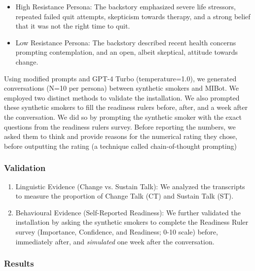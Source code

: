 \begin{itemize}
    \item High Resistance Persona: The backstory emphasized severe life stressors, repeated failed quit attempts, skepticism towards therapy, and a strong belief that it was not the right time to quit.
    \item Low Resistance Persona: The backstory described recent health concerns prompting contemplation, and an open, albeit skeptical, attitude towards change.
\end{itemize}

Using modified prompts and GPT-4 Turbo (temperature=1.0), we generated conversations (N=10 per persona) between synthetic smokers and MIBot. We employed two distinct methods to validate the installation. We also prompted these synthetic smokers to fill the readiness rulers before, after, and a week after the conversation. We did so  by prompting the synthetic smoker with the exact questions from the readiness rulers survey. Before reporting the numbers, we asked them to think and provide reasons for the numerical rating they chose, before outputting the rating (a technique called chain-of-thought prompting)

\subsubsection{Validation}

\begin{enumerate}
    \item Linguistic Evidence (Change vs. Sustain Talk): We analyzed the transcripts to measure the proportion of Change Talk (CT) and Sustain Talk (ST).


    \item Behavioural 
Evidence (Self-Reported Readiness): We further validated the installation by asking the synthetic smokers to complete the Readiness Ruler survey (Importance, Confidence, and Readiness; 0-10 scale) before, immediately after, and \emph{simulated} one week after the conversation.

\end{enumerate}






\subsubsection{Results} 



